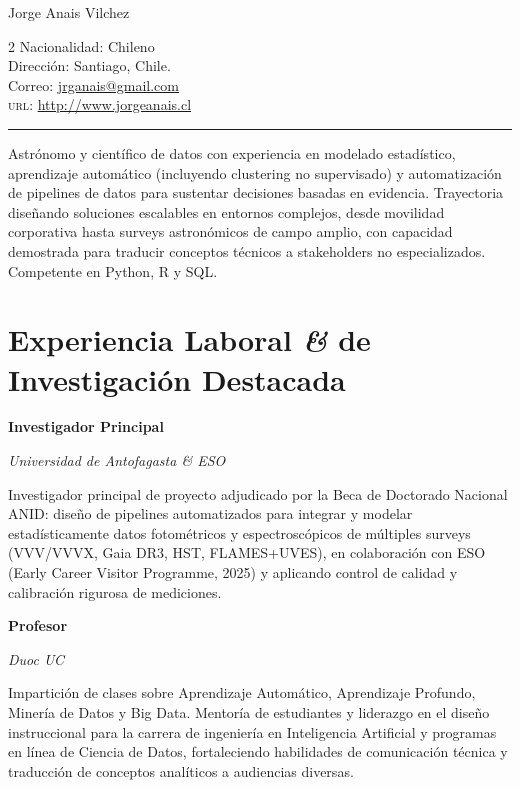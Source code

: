 \documentclass[10pt, a4paper]{article}
\newcommand{\amper}{{\itshape\addfontfeatures{Scale=.95}\&}}
\newcommand{\years}[1]{\marginnote{ #1}}
\newcommand{\workitem}[4]{
    \years{#1}\textbf{\textcolor{ViridianGreen}{#2}}\par
    \textit{#3}\par
    \textcolor{Jet}{\small #4}\vspace{0.3cm}\par
}
\begin{document}
{\LARGE \textcolor{DarkCornflowerBlue}{Jorge Anais Vilchez}} \\

\begin{minipage}{22 cm}
\begin{multicols}{2}
Nacionalidad: Chileno\\
Dirección: Santiago, Chile.\\ 
\vfill\eject
Correo: \href{mailto:jrganais@gmail.com}{jrganais@gmail.com}\\
\textsc{url}: \href{http://www.jorgeanais.cl}{http://www.jorgeanais.cl}\\ 
\end{multicols}
\end{minipage}

\hrule

\vspace{0.3cm}

\begin{flushright}  
  \begin{minipage}{15 cm}
  \textcolor{Jet}{\small Astrónomo y científico de datos con experiencia en modelado estadístico, aprendizaje automático (incluyendo clustering no supervisado) y automatización de pipelines de datos para sustentar decisiones basadas en evidencia. Trayectoria diseñando soluciones escalables en entornos complejos, desde movilidad corporativa hasta surveys astronómicos de campo amplio, con capacidad demostrada para traducir conceptos técnicos a stakeholders no especializados. Competente en Python, R y SQL.}
  \end{minipage}
\end{flushright}
%

\section*{Experiencia Laboral \amper{} de Investigación Destacada}

\workitem{2023-presente}{Investigador Principal}{Universidad de Antofagasta \& ESO}{Investigador principal de proyecto adjudicado por la Beca de Doctorado Nacional ANID: diseño de pipelines automatizados para integrar y modelar estadísticamente datos fotométricos y espectroscópicos de múltiples surveys (VVV/VVVX, Gaia DR3, HST, FLAMES+UVES), en colaboración con ESO (Early Career Visitor Programme, 2025) y aplicando control de calidad y calibración rigurosa de mediciones.}

\workitem{2023-presente}{Profesor}{Duoc UC}{Impartición de clases sobre Aprendizaje Automático, Aprendizaje Profundo, Minería de Datos y Big Data. Mentoría de estudiantes y liderazgo en el diseño instruccional para la carrera de ingeniería en Inteligencia Artificial y programas en línea de Ciencia de Datos, fortaleciendo habilidades de comunicación técnica y traducción de conceptos analíticos a audiencias diversas.}
\end{document}

